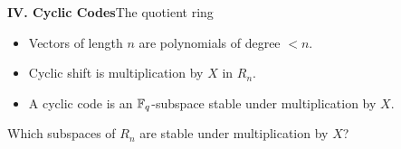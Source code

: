 \begin{frame}{\textbf{IV. Cyclic Codes}}{The quotient ring}
\small
{}
\begin{itemize}
  \item Vectors of length $n$ are polynomials of degree $<n$.
  \item Cyclic shift is multiplication by $X$ in $R_n$.
  \item A cyclic code is an $\mathbb{F}_q$-subspace stable under multiplication by $X$.
\end{itemize}
Which subspaces of $R_n$ are stable under multiplication by $X$?
\end{frame}

